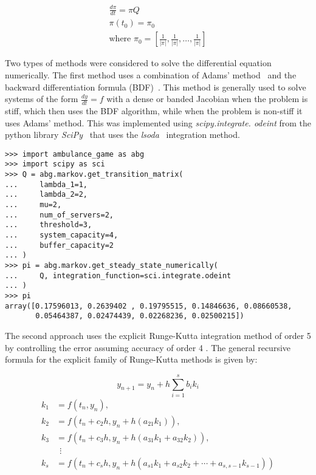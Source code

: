 \begin{gather}
    \frac{d\pi}{dt} = \pi Q \\
    \pi(t_0) = \pi_0 \nonumber \\
    \text{where } \pi_0 =
    [\frac{1}{|\pi|}, \frac{1}{|\pi|}, \dots, \frac{1}{|\pi|}] \nonumber
\end{gather}

Two types of methods were considered to solve the differential equation
numerically.
The first method uses a combination of Adams' method~\cite{adams_method} and the
backward differentiation formula (BDF)~\cite{backward_differentiation_formula}.
This method is generally used to solve systems of the form
\(\frac{dy}{dt} = f\) with a dense or banded Jacobian when the problem is stiff,
which then uses the BDF algorithm, while when the problem is non-stiff it uses
Adams' method.
This was implemented using \textit{scipy.integrate. odeint} from the python
library \textit{SciPy}~\cite{2020SciPy-NMeth} that uses the
\textit{lsoda}~\cite{lsoda_algorithm} integration method.

\begin{lstlisting}[style=pystyle]
>>> import ambulance_game as abg
>>> import scipy as sci
>>> Q = abg.markov.get_transition_matrix(
...     lambda_1=1,
...     lambda_2=2,
...     mu=2,
...     num_of_servers=2,
...     threshold=3,
...     system_capacity=4,
...     buffer_capacity=2
... )
>>> pi = abg.markov.get_steady_state_numerically(
...     Q, integration_function=sci.integrate.odeint
... )
>>> pi
array([0.17596013, 0.2639402 , 0.19795515, 0.14846636, 0.08660538,
       0.05464387, 0.02474439, 0.02268236, 0.02500215])

\end{lstlisting}



The second approach uses the explicit Runge-Kutta integration method of order 5
by controlling the error assuming accuracy of order 4
\cite{solve_ivp_rk45_method, runge_kutta_formulas}.
The general recursive formula for the explicit family of Runge-Kutta methods is
given by:

\begin{equation}
    y_{n+1} = y_n + h \sum_{i=1}^s b_i k_i
\end{equation}
\begin{align}
    k_1 & = f(t_n, y_n), \nonumber \\
    k_2 & = f(t_n+c_2h, y_n+h(a_{21}k_1)), \nonumber \\
    k_3 & = f(t_n+c_3h, y_n+h(a_{31}k_1+a_{32}k_2)), \nonumber \\
        & \ \ \vdots \nonumber \\
    k_s & = f(t_n+c_s h, y_n+h(a_{s1}k_1+a_{s2}k_2+\cdots+a_{s,s-1}k_{s-1}))
    \nonumber
\end{align}

